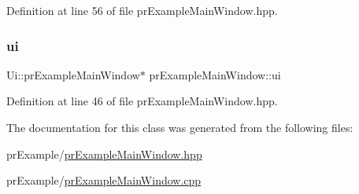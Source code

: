 Definition at line 56 of file pr\+Example\+Main\+Window.\+hpp.

\mbox{\label{classpr_example_main_window_a834d83295e9242720576962487363786}} 
\subsubsection{\texorpdfstring{ui}{ui}}
{\footnotesize\ttfamily Ui\+::pr\+Example\+Main\+Window$\ast$ pr\+Example\+Main\+Window\+::ui\hspace{0.3cm}{\ttfamily [private]}}



Definition at line 46 of file pr\+Example\+Main\+Window.\+hpp.



The documentation for this class was generated from the following files\+:\begin{DoxyCompactItemize}
\item 
pr\+Example/\hyperlink{pr_example_main_window_8hpp}{pr\+Example\+Main\+Window.\+hpp}\item 
pr\+Example/\hyperlink{pr_example_main_window_8cpp}{pr\+Example\+Main\+Window.\+cpp}\end{DoxyCompactItemize}
